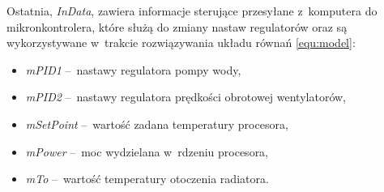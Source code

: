 Ostatnia, \textit{InData}, zawiera informacje sterujące przesyłane z~komputera
do mikronkontrolera, które służą do zmiany nastaw regulatorów oraz są
wykorzystywane w~trakcie rozwiązywania układu równań \eqref{equ:model}:
\begin{itemize}
    \item \textit{mPID1} --~nastawy regulatora pompy wody,
    \item \textit{mPID2} --~nastawy regulatora prędkości obrotowej wentylatorów,
    \item \textit{mSetPoint} --~wartość zadana temperatury procesora,
    \item \textit{mPower} --~moc wydzielana w~rdzeniu procesora,
    \item \textit{mTo} --~wartość temperatury otoczenia radiatora.
\end{itemize}
